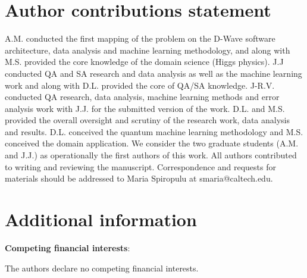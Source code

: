\documentclass[.chapters/Higgs/.chapters/Higgs/main.tex]{subfiles}
\begin{document}
%

\section*{Author contributions statement}
A.M. conducted  the first mapping of the problem on the D-Wave software architecture, data analysis and machine learning methodology,  and along with M.S. provided the core knowledge of the domain science (Higgs physics). J.J conducted  QA and SA  research and data analysis as well as the machine learning work and along with D.L. provided the core of QA/SA knowledge. J-R.V. conducted  QA research, data analysis, machine learning methods and error analysis work with J.J. for the submitted version of the work.  D.L. and M.S. provided the overall oversight and scrutiny of the research work, data analysis and results.  D.L. conceived the quantum machine learning methodology and M.S. conceived the domain application.   We consider the two graduate students (A.M. and J.J.) as operationally the first authors of this work. All authors contributed to writing and reviewing the manuscript. Correspondence and requests for materials should be addressed to Maria Spiropulu at smaria@caltech.edu.
%

\section*{Additional information}
%
\textbf{Competing financial interests}:

The authors declare no competing financial interests.


\FloatBarrier
\newpage\newpage
\end{document}
